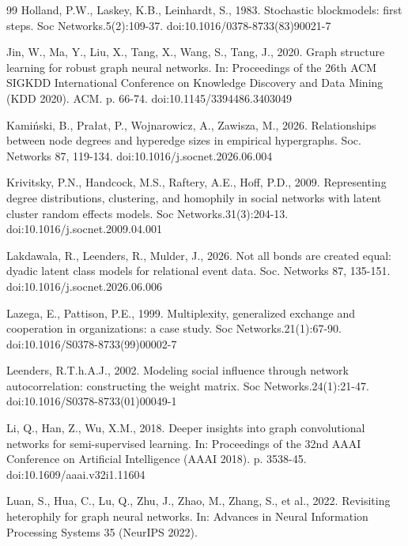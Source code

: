 \documentclass[onecolumn,pdflatex,sn-basic,Numbered]{sn-jnl}
\theoremstyle{thmstyleone}
\theoremstyle{thmstylethree}
\begin{document}
\begin{thebibliography}{99}
Holland, P.W., Laskey, K.B., Leinhardt, S., 1983. Stochastic blockmodels: first steps. Soc Networks.5(2):109-37. doi:10.1016/0378-8733(83)90021-7

Jin, W., Ma, Y., Liu, X., Tang, X., Wang, S., Tang, J., 2020. Graph structure learning for robust graph neural networks. In: Proceedings of the 26th ACM SIGKDD International Conference on Knowledge Discovery and Data Mining (KDD 2020). ACM. p. 66-74. doi:10.1145/3394486.3403049

Kami\'nski, B., Pra{\l}at, P., Wojnarowicz, A., Zawisza, M., 2026. Relationships between node degrees and hyperedge sizes in empirical hypergraphs. Soc. Networks 87, 119-134. doi:10.1016/j.socnet.2026.06.004

Krivitsky, P.N., Handcock, M.S., Raftery, A.E., Hoff, P.D., 2009. Representing degree distributions, clustering, and homophily in social networks with latent cluster random effects models. Soc Networks.31(3):204-13. doi:10.1016/j.socnet.2009.04.001

Lakdawala, R., Leenders, R., Mulder, J., 2026. Not all bonds are created equal: dyadic latent class models for relational event data. Soc. Networks 87, 135-151. doi:10.1016/j.socnet.2026.06.006

Lazega, E., Pattison, P.E., 1999. Multiplexity, generalized exchange and cooperation in organizations: a case study. Soc Networks.21(1):67-90. doi:10.1016/S0378-8733(99)00002-7

Leenders, R.T.h.A.J., 2002. Modeling social influence through network autocorrelation: constructing the weight matrix. Soc Networks.24(1):21-47. doi:10.1016/S0378-8733(01)00049-1

Li, Q., Han, Z., Wu, X.M., 2018. Deeper insights into graph convolutional networks for semi-supervised learning. In: Proceedings of the 32nd AAAI Conference on Artificial Intelligence (AAAI 2018). p. 3538-45. doi:10.1609/aaai.v32i1.11604

Luan, S., Hua, C., Lu, Q., Zhu, J., Zhao, M., Zhang, S., et al., 2022. Revisiting heterophily for graph neural networks. In: Advances in Neural Information Processing Systems 35 (NeurIPS 2022).


\end{thebibliography}
\end{document}
